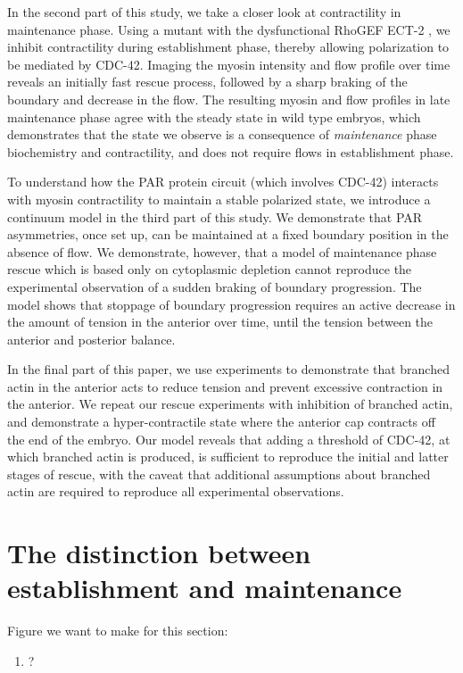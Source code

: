 \documentclass[11pt]{article}
\newcommand{\red}[1]{\color{red}#1\normalcolor}
\newcommand{\6}[1]{#1_{\text{6}}}
\newcommand{\3}[1]{#1_{\text{3}}}
\begin{document}
In the second part of this study, we take a closer look at contractility in maintenance phase. Using a mutant with the dysfunctional RhoGEF ECT-2 \cite{zonies2010symmetry}, we inhibit contractility during establishment phase, thereby allowing polarization to be mediated by CDC-42. Imaging the myosin intensity and flow profile over time reveals an initially fast rescue process, followed by a sharp braking of the boundary and decrease in the flow. The resulting myosin and flow profiles in late maintenance phase agree with the steady state in wild type embryos, which demonstrates that the state we observe is a consequence of \emph{maintenance} phase biochemistry and contractility, and does not require flows in establishment phase.

To understand how the PAR protein circuit (which involves CDC-42) interacts with myosin contractility to maintain a stable polarized state, we introduce a continuum model in the third part of this study. We demonstrate that PAR asymmetries, once set up, can be maintained at a fixed boundary position in the absence of flow. We demonstrate, however, that a model of maintenance phase rescue which is based only on cytoplasmic depletion \cite{goehring2011polarization} cannot reproduce the experimental observation of a sudden braking of boundary progression. The model shows that stoppage of boundary progression requires an active decrease in the amount of tension in the anterior over time, until the tension between the anterior and posterior balance. 

In the final part of this paper, we use experiments to demonstrate that branched actin in the anterior acts to reduce tension \cite{muresan2022f, yang2012arp2} and prevent excessive contraction in the anterior. We repeat our rescue experiments with inhibition of branched actin, and demonstrate a hyper-contractile state where the anterior cap contracts off the end of the embryo. Our model reveals that adding a threshold of CDC-42, at which branched actin is produced, is sufficient to reproduce the initial and latter stages of rescue, with the caveat that additional assumptions about branched actin are required to reproduce all experimental observations.

\section{The distinction between establishment and maintenance}

\red{Figure we want to make for this section:
\begin{enumerate}[label=(\alph*),topsep=0pt,itemsep=-2ex]
\item ?
\end{enumerate}
}
\end{document}
